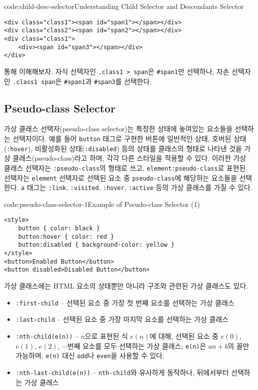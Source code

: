\begin{codeenv}{code:child-desc-selector}{Understanding Child Selector and Descendants Selector}\begin{verbatim}
<div class="class1"><span id="span1"></span></div>
<div class="class2"><span id="span2"></span></div>
<div class="class1">
    <div><span id="span3"></span></div>
</div>
\end{verbatim}
\end{codeenv}

\를 통해 이해해보자. 자식 선택자인 \texttt{.class1 > span}은 \texttt{\#span1}만 선택하나, 자손 선택자인 \texttt{.class1 span}은 \texttt{\#span1}과 \texttt{\#span3}를 선택한다.

\subsection*{Pseudo-class Selector}
가상 클래스 선택자(pseudo-class selector)는 특정한 상태에 놓여있는 요소들을 선택하는 선택자이다. 예를 들어 \texttt{button} 태그로 구현한 버튼에 일반적인 상태, 호버된 상태(\texttt{:hover}), 비활성화된 상태(\texttt{:disabled}) 등의 상태를 클래스의 형태로 나타낸 것을 가상 클래스(pseudo-class)라고 하며, 각각 다른 스타일을 적용할 수 있다. 이러한 가상 클래스 선택자는 \texttt{:pseudo-class}의 형태로 쓰고, \texttt{element:pseudo-class}로 표현된 선택자는 \texttt{element} 선택자로 선택된 요소 중 \texttt{pseudo-class}에 해당하는 요소들을 선택한다. \texttt{a} 태그는 \texttt{:link}, \texttt{:visited}, \texttt{:hover}, \texttt{:active} 등의 가상 클래스를 가질 수 있다.

\begin{codeenv}{code:pseudo-class-selector-1}{Example of Pseudo-class Selector (1)}\begin{verbatim}
<style>
    button { color: black }
    button:hover { color: red }
    button:disabled { background-color: yellow }
</style>
<button>Enabled Button</button>
<button disabled>Disabled Button</button>
\end{verbatim}
\end{codeenv}

가상 클래스에는 HTML 요소의 상태뿐만 아니라 구조와 관련된 가상 클래스도 있다.

\begin{itemize}
    \item \texttt{:first-child} – 선택된 요소 중 가장 첫 번째 요소를 선택하는 가상 클래스
    \item \texttt{:last-child} – 선택된 요소 중 가장 마지막 요소를 선택하는 가상 클래스
    \item \texttt{:nth-child(e(n))} – $n$으로 표현된 식 $e(n)$에 대해, 선택된 요소 중 $e(0)$, $e(1)$, $e(2)$, $\cdots$번째 요소를 모두 선택하는 가상 클래스; \texttt{e(n)}은 $an+b$의 꼴만 가능하며, \texttt{e(n)} 대신 \texttt{odd}나 \texttt{even}을 사용할 수 있다.
    \item \texttt{:nth-last-child(e(n))} – \texttt{nth-child}와 유사하게 동작하나, 뒤에서부터 선택하는 가상 클래스
\end{itemize}

